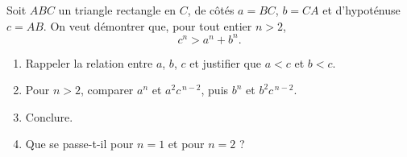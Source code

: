 Soit $ABC$ un triangle rectangle en $C$, de côtés $a = BC$, $b = CA$ et
d'hypoténuse $c = AB$. On veut démontrer que, pour tout entier $n > 2$,
\[
c^n > a^n + b^n .
\]
\begin{enumerate}
  \item Rappeler la relation entre $a$, $b$, $c$ et justifier que $a < c$ et
  $b < c$.
  \item Pour $n > 2$, comparer $a^n$ et $a^2 c^{\,n-2}$, puis $b^n$ et
  $b^2 c^{\,n-2}$.
  \item Conclure.
  \item Que se passe-t-il pour $n = 1$ et pour $n = 2$ ?
\end{enumerate}
